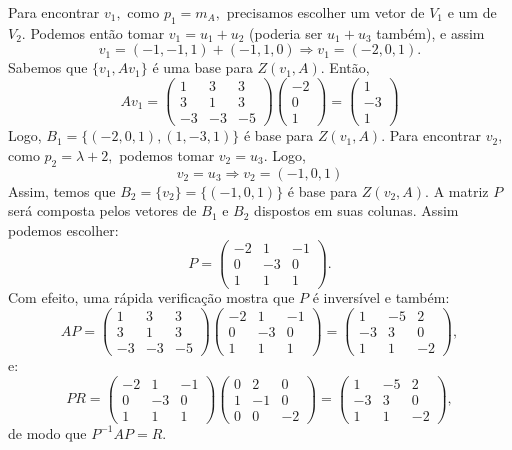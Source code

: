\documentclass[11pt,a4paper]{article}
\begin{document}
{\noindent
Para encontrar $v_1,$ como $p_1 = m_A,$ precisamos escolher um vetor de $V_1$ e um de $V_2.$ Podemos então tomar $v_1 = u_1 + u_2$ (poderia ser $u_1 + u_3$ também), e assim
\[
v_1 = (-1,-1,1) + (-1,1,0) \Rightarrow v_1 = (-2,0,1).
\]
Sabemos que $\{ v_1, Av_1 \}$ é uma base para $Z(v_1, A).$ Então,
\[
Av_ 1 =  \begin{pmatrix}
1 & 3 & 3 \\
3 & 1 & 3 \\
-3 & -3 & -5
\end{pmatrix} \begin{pmatrix}
-2 \\ 0 \\ 1
\end{pmatrix} = \begin{pmatrix}
1 \\ -3 \\ 1
\end{pmatrix}
\]
Logo, $B_1 = \{ (-2,0,1),(1, -3 , 1)\} $ é base para $Z(v_1, A).$
Para encontrar $v_2,$ como $p_2 = \lambda + 2,$ podemos tomar $v_2 = u_3.$ Logo,
\[
v_2 = u_3 \Rightarrow v_2 =  (-1,0,1)
\]
Assim, temos que $B_2 = \{v_2 \} = \{ (-1,0,1) \}$ é base para $Z(v_2, A).$ A matriz $P$ será composta pelos vetores de $B_1$ e $B_2$ dispostos em suas colunas. Assim podemos escolher:
\[
P = \begin{pmatrix}
-2 & 1& -1\\
0 &-3 & 0\\
1 &1 &1
\end{pmatrix}.
\]
Com efeito, uma rápida verificação mostra que $P$ é inversível e também:
\[
AP = \begin{pmatrix}
1 & 3 & 3 \\
3 & 1 & 3 \\
-3 & -3 & -5
\end{pmatrix}\begin{pmatrix}
-2 & 1& -1\\
0 &-3 & 0\\
1 &1 &1
\end{pmatrix} = \begin{pmatrix}
1 & -5 & 2 \\
-3 & 3 & 0 \\
1 & 1 & -2
\end{pmatrix},
\]
e:
\[
PR = \begin{pmatrix}
-2 & 1& -1\\
0 &-3 & 0\\
1 &1 &1\end{pmatrix}\begin{pmatrix}
0 & 2 & 0 \\
1 & -1 & 0 \\
0 & 0 & -2
\end{pmatrix} = \begin{pmatrix}
1 & -5 & 2 \\
-3 & 3 & 0 \\
1 & 1 & -2
\end{pmatrix},
\]
de modo que $P^{-1}AP=R$.
}
\end{document}
